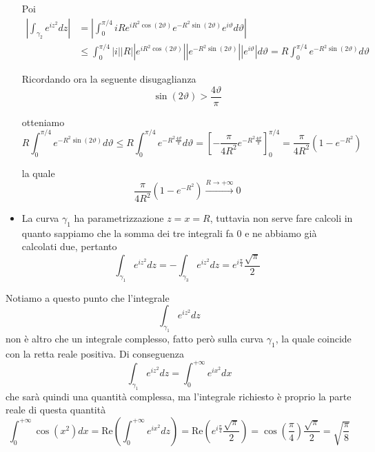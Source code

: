 \begin{itemize}
Poi\begin{align*}
\left| \int\nolimits _{\gamma _{2}} e^{iz^{2}} dz\right|  & =\left| \int\nolimits ^{\pi /4}_{0} iRe^{iR^{2}\cos\left( 2\vartheta \right)} e^{-R^{2}\sin\left( 2\vartheta \right)} e^{i\vartheta } d\vartheta \right| \\
 & \leqslant \int\nolimits ^{\pi /4}_{0}\left| i\right| \left| R\right| \left| e^{iR^{2}\cos\left( 2\vartheta \right)}\right| \left| e^{-R^{2}\sin\left( 2\vartheta \right)}\right| \left| e^{i\vartheta }\right| d\vartheta =R\int\nolimits ^{\pi /4}_{0} e^{-R^{2}\sin\left( 2\vartheta \right)} d\vartheta 
\end{align*}

Ricordando ora la seguente disugaglianza\begin{equation*}
\sin\left( 2\vartheta \right)  >\frac{4\vartheta }{\pi }
\end{equation*}

otteniamo\begin{equation*}
R\int\nolimits ^{\pi /4}_{0} e^{-R^{2}\sin\left( 2\vartheta \right)} d\vartheta \leqslant R\int\nolimits ^{\pi /4}_{0} e^{-R^{2}\frac{4\vartheta }{\pi }} d\vartheta =\left[ -\frac{\pi }{4R^{2}} e^{-R^{2}\frac{4\vartheta }{\pi }}\right]^{\pi /4}_{0} =\frac{\pi }{4R^{2}}\left( 1-e^{-R^{2}}\right)
\end{equation*}

la quale\begin{equation*}
\frac{\pi }{4R^{2}}\left( 1-e^{-R^{2}}\right)\xrightarrow{R\rightarrow +\infty } 0
\end{equation*}
\item La curva $\gamma _{1}$ ha parametrizzazione $z=x=R$, tuttavia non serve fare calcoli in quanto sappiamo che la somma dei tre integrali fa $0$ e ne abbiamo già calcolati due, pertanto\begin{equation*}
\int\nolimits _{\gamma _{1}} e^{iz^{2}} dz=-\int\nolimits _{\gamma _{3}} e^{iz^{2}} dz=e^{i\frac{\pi }{4}}\frac{\sqrt{\pi }}{2}
\end{equation*}
\end{itemize}

Notiamo a questo punto che l'integrale
\begin{equation*}
\int\nolimits _{\gamma _{1}} e^{iz^{2}} dz
\end{equation*}
non è altro che un integrale complesso, fatto però sulla curva $\gamma _{1}$, la quale coincide con la retta reale positiva. Di conseguenza
\begin{equation*}
\int\nolimits _{\gamma _{1}} e^{iz^{2}} dz=\int\nolimits ^{+\infty }_{0} e^{ix^{2}} dx
\end{equation*}
che sarà quindi una quantità complessa, ma l'integrale richiesto è proprio la parte reale di questa quantità
\begin{equation*}
\int\nolimits ^{+\infty }_{0}\cos\left( x^{2}\right) dx=\mathrm{Re}\left(\int\nolimits ^{+\infty }_{0} e^{ix^{2}} dz\right) =\mathrm{Re}\left( e^{i\frac{\pi }{4}}\frac{\sqrt{\pi }}{2}\right) =\cos\left(\frac{\pi }{4}\right)\frac{\sqrt{\pi }}{2} =\sqrt{\frac{\pi }{8}}
\end{equation*}
